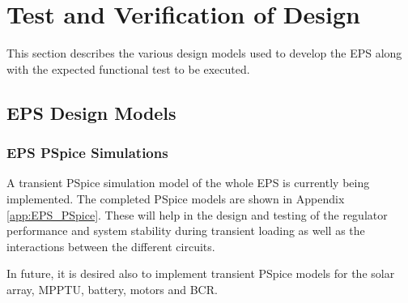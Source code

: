 \section{Test and Verification of Design}
\label{sec:test_verification}
This section describes the various design models used to develop the \ac{EPS} along with the expected functional test to be executed.
%
\subsection{EPS Design Models}
%
\subsubsection{EPS PSpice Simulations}
A transient PSpice simulation model of the whole \ac{EPS} is currently being implemented. The completed PSpice models are shown in Appendix \ref{app:EPS_PSpice}. These will help in the design and testing of the regulator performance and system stability during transient loading as well as the interactions between the different circuits.

In future, it is desired also to implement transient PSpice models for the solar array\cite{Castaner}, \ac{MPPTU}, battery\cite{gold}, motors and \ac{BCR}.
%
